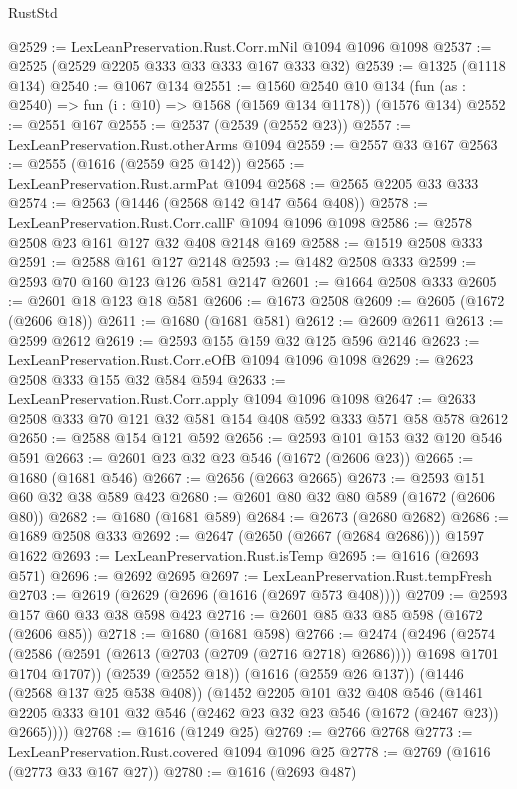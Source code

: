 \begin{lexlean}{RustStd}
\begin{coremodule}
{\begin{coremodule}
{{{{{{{{{{{@2529 := LexLeanPreservation.Rust.Corr.mNil @1094 @1096 @1098
@2537 := @2525 (@2529 @2205 @333 @33 @333 @167 @333 @32)
@2539 := @1325 (@1118 @134)
@2540 := @1067 @134
@2551 := @1560
    @2540
    @10
    @134
    (fun (as : @2540) => fun (i : @10) => @1568 (@1569 @134 @1178))
    (@1576 @134)
@2552 := @2551 @167
@2555 := @2537 (@2539 (@2552 @23))
@2557 := LexLeanPreservation.Rust.otherArms @1094
@2559 := @2557 @33 @167
@2563 := @2555 (@1616 (@2559 @25 @142))
@2565 := LexLeanPreservation.Rust.armPat @1094
@2568 := @2565 @2205 @33 @333
@2574 := @2563 (@1446 (@2568 @142 @147 @564 @408))
@2578 := LexLeanPreservation.Rust.Corr.callF @1094 @1096 @1098
@2586 := @2578 @2508 @23 @161 @127 @32 @408 @2148 @169
@2588 := @1519 @2508 @333
@2591 := @2588 @161 @127 @2148
@2593 := @1482 @2508 @333
@2599 := @2593 @70 @160 @123 @126 @581 @2147
@2601 := @1664 @2508 @333
@2605 := @2601 @18 @123 @18 @581
@2606 := @1673 @2508
@2609 := @2605 (@1672 (@2606 @18))
@2611 := @1680 (@1681 @581)
@2612 := @2609 @2611
@2613 := @2599 @2612
@2619 := @2593 @155 @159 @32 @125 @596 @2146
@2623 := LexLeanPreservation.Rust.Corr.eOfB @1094 @1096 @1098
@2629 := @2623 @2508 @333 @155 @32 @584 @594
@2633 := LexLeanPreservation.Rust.Corr.apply @1094 @1096 @1098
@2647 := @2633 @2508 @333 @70 @121 @32 @581 @154 @408 @592 @333 @571 @58 @578 @2612
@2650 := @2588 @154 @121 @592
@2656 := @2593 @101 @153 @32 @120 @546 @591
@2663 := @2601 @23 @32 @23 @546 (@1672 (@2606 @23))
@2665 := @1680 (@1681 @546)
@2667 := @2656 (@2663 @2665)
@2673 := @2593 @151 @60 @32 @38 @589 @423
@2680 := @2601 @80 @32 @80 @589 (@1672 (@2606 @80))
@2682 := @1680 (@1681 @589)
@2684 := @2673 (@2680 @2682)
@2686 := @1689 @2508 @333
@2692 := @2647 (@2650 (@2667 (@2684 @2686))) @1597 @1622
@2693 := LexLeanPreservation.Rust.isTemp
@2695 := @1616 (@2693 @571)
@2696 := @2692 @2695
@2697 := LexLeanPreservation.Rust.tempFresh
@2703 := @2619 (@2629 (@2696 (@1616 (@2697 @573 @408))))
@2709 := @2593 @157 @60 @33 @38 @598 @423
@2716 := @2601 @85 @33 @85 @598 (@1672 (@2606 @85))
@2718 := @1680 (@1681 @598)
@2766 := @2474
    (@2496
      (@2574 (@2586 (@2591 (@2613 (@2703 (@2709 (@2716 @2718) @2686)))) @1698 @1701 @1704 @1707))
      (@2539 (@2552 @18))
      (@1616 (@2559 @26 @137))
      (@1446 (@2568 @137 @25 @538 @408))
      (@1452
        @2205
        @101
        @32
        @408
        @546
        (@1461 @2205 @333 @101 @32 @546 (@2462 @23 @32 @23 @546 (@1672 (@2467 @23)) @2665))))
@2768 := @1616 (@1249 @25)
@2769 := @2766 @2768
@2773 := LexLeanPreservation.Rust.covered @1094 @1096 @25
@2778 := @2769 (@1616 (@2773 @33 @167 @27))
@2780 := @1616 (@2693 @487)
}}}}}}}}}}}
\end{coremodule}}
\end{coremodule}
\end{lexlean}
